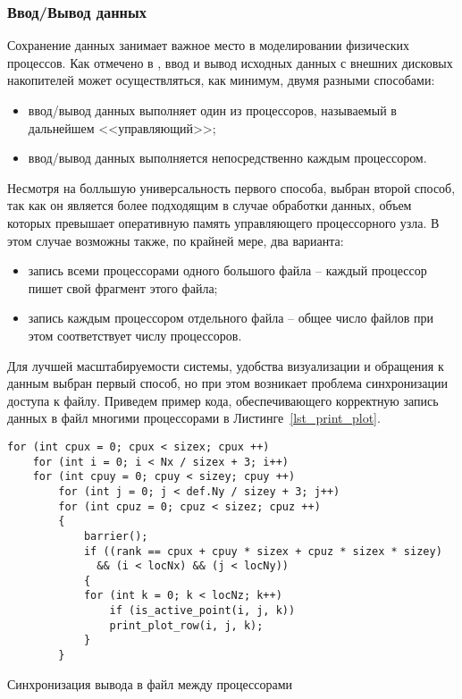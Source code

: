 \subsubsection*{Ввод/Вывод данных}
Сохранение данных занимает важное место в моделировании
физических процессов. Как отмечено в \cite{Yakobovsky},
ввод и вывод исходных данных с внешних дисковых накопителей может осуществляться, как минимум,
двумя разными способами:
\begin{itemize}
\item ввод/вывод данных выполняет один из процессоров, называемый в
дальнейшем <<управляющий>>;
\item ввод/вывод данных выполняется непосредственно каждым процессором.
\end{itemize}
Несмотря на болльшую универсальность первого способа,
выбран второй способ, так как он является более подходящим
в случае обработки данных, объем которых превышает оперативную память управляющего
процессорного узла.
В этом случае возможны также, по крайней мере, два варианта:
\begin{itemize}
\item запись всеми процессорами одного большого файла -- каждый процессор
пишет свой фрагмент этого файла;
\item запись каждым процессором отдельного файла -- общее число файлов
при этом соответствует числу процессоров.
\end{itemize}
Для лучшей масштабируемости системы, удобства визуализации и обращения
к данным выбран первый способ,
но при этом возникает проблема синхронизации доступа к файлу.
Приведем пример кода, обеспечивающего корректную запись данных в файл
многими процессорами в Листинге~\ref{lst_print_plot}.
\begin{listing}
\begin{verbatim}
for (int cpux = 0; cpux < sizex; cpux ++)
    for (int i = 0; i < Nx / sizex + 3; i++)
	for (int cpuy = 0; cpuy < sizey; cpuy ++)
	    for (int j = 0; j < def.Ny / sizey + 3; j++)
		for (int cpuz = 0; cpuz < sizez; cpuz ++)
		{
		    barrier();
		    if ((rank == cpux + cpuy * sizex + cpuz * sizex * sizey)
			  && (i < locNx) && (j < locNy))
		    {
			for (int k = 0; k < locNz; k++)
			    if (is_active_point(i, j, k))
				print_plot_row(i, j, k);
		    }
		}
\end{verbatim}
\caption{Синхронизация вывода в файл между процессорами}
\label{lst_print_plot}
\end{listing}

